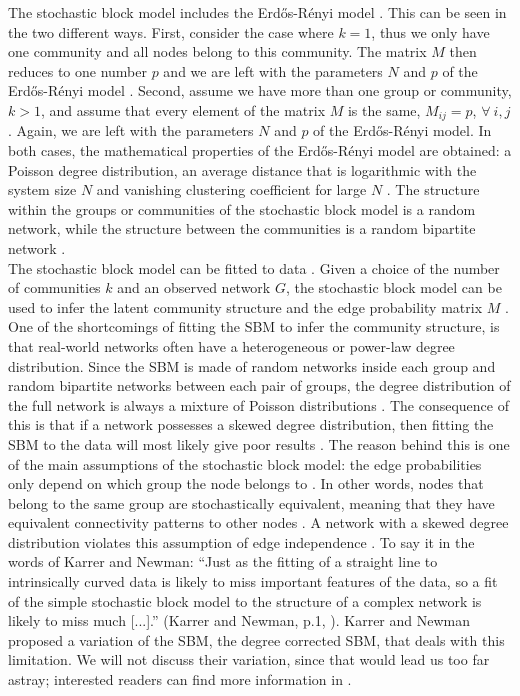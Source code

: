 \documentclass[11 pt , letterpaper , twoside , openright]{book}
\begin{document}
The stochastic block model includes the Erd\H{o}s-R\'{e}nyi model \cite{Clauset2017}. This can be seen in the two different ways. First, consider the case where $k = 1$, thus we only have one community and all nodes belong to this community. The matrix $M$ then reduces to one number $p$ and we are left with the parameters $N$ and $p$ of the Erd\H{o}s-R\'{e}nyi model \cite{Clauset2017}. Second, assume we have more than one group or community, $k > 1$, and assume that every element of the matrix $M$ is the same, $M_{ij} = p$, $\forall \ i, j$ \cite{Clauset2017}. Again, we are left with the parameters $N$ and $p$ of the Erd\H{o}s-R\'{e}nyi model. In both cases, the mathematical properties of the Erd\H{o}s-R\'{e}nyi model are obtained: a Poisson degree distribution, an average distance that is logarithmic with the system size $N$ and vanishing clustering coefficient for large $N$ \cite{Clauset2017}. The structure within the groups or communities of the stochastic block model is a random network, while the structure between the communities is a random bipartite network \cite{Clauset2017}.\\
\newline
The stochastic block model can be fitted to data \cite{Clauset2017}. Given a choice of the number of communities $k$ and an observed network $G$, the stochastic block model can be used to infer the latent community structure and the edge probability matrix $M$ \cite{Clauset2017}. One of the shortcomings of fitting the SBM to infer the community structure, is that real-world networks often have a heterogeneous or power-law degree distribution. Since the SBM is made of random networks inside each group and random bipartite networks between each pair of groups, the degree distribution of the full network is always a mixture of Poisson distributions \cite{Clauset2017}. The consequence of this is that if a network possesses a skewed degree distribution, then fitting the SBM to the data will most likely give poor results \cite{Karrer2011}. The reason behind this is one of the main assumptions of the stochastic block model: the edge probabilities only depend on which group the node belongs to \cite{Clauset2017}. In other words, nodes that belong to the same group are stochastically equivalent, meaning that they have equivalent connectivity patterns to other nodes \cite{Clauset2017}. A network with a skewed degree distribution violates this assumption of edge independence \cite{Clauset2017}. To say it in the words of Karrer and Newman: ``Just as the fitting of a straight line to intrinsically curved data is likely to miss important features of the data, so a fit of the simple stochastic block model to the structure of a complex network is likely to miss much [...].'' (Karrer and Newman, p.1, \cite{Karrer2011}). Karrer and Newman proposed a variation of the SBM, the degree corrected SBM, that deals with this limitation. We will not discuss their variation, since that would lead us too far astray; interested readers can find more information in \cite{Karrer2011}. \\
\end{document}
